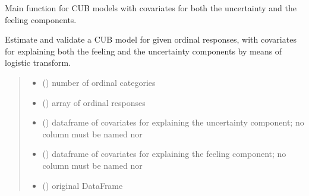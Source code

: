 \documentclass[letterpaper,10pt,english]{sphinxmanual}
\begin{document}
\begin{fulllineitems}
\label{\detokenize{cubmods:cubmods.cub_yw.mle}}
\pysigstartsignatures
{}
\pysigstopsignatures
\sphinxAtStartPar
Main function for CUB models with covariates for both the uncertainty and the feeling components.

\sphinxAtStartPar
Estimate and validate a CUB model for given ordinal responses, with covariates for explaining both the
feeling and the uncertainty components by means of logistic transform.
\begin{quote}\begin{description}
\begin{itemize}
\item {} 
\sphinxAtStartPar
{} () \textendash{} number of ordinal categories

\item {} 
\sphinxAtStartPar
{} () \textendash{} array of ordinal responses

\item {} 
\sphinxAtStartPar
{} () \textendash{} dataframe of covariates for explaining the uncertainty component;
no column must be named  nor 

\item {} 
\sphinxAtStartPar
{} () \textendash{} dataframe of covariates for explaining the feeling component;
no column must be named  nor 

\item {} 
\sphinxAtStartPar
{} () \textendash{} original DataFrame


\end{itemize}
\end{description}
\end{quote}
\end{fulllineitems}
\end{document}
